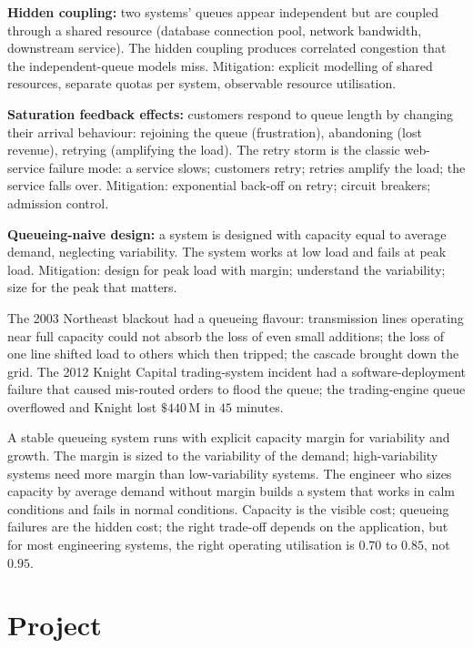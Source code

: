 \textbf{Hidden coupling:} two systems' queues appear independent but are coupled through a shared resource (database connection pool, network bandwidth, downstream service). The hidden coupling produces correlated congestion that the independent-queue models miss. Mitigation: explicit modelling of shared resources, separate quotas per system, observable resource utilisation.

\textbf{Saturation feedback effects:} customers respond to queue length by changing their arrival behaviour: rejoining the queue (frustration), abandoning (lost revenue), retrying (amplifying the load). The retry storm is the classic web-service failure mode: a service slows; customers retry; retries amplify the load; the service falls over. Mitigation: exponential back-off on retry; circuit breakers; admission control.

\textbf{Queueing-naive design:} a system is designed with capacity equal to average demand, neglecting variability. The system works at low load and fails at peak load. Mitigation: design for peak load with margin; understand the variability; size for the peak that matters.

The 2003 Northeast blackout had a queueing flavour: transmission lines operating near full capacity could not absorb the loss of even small additions; the loss of one line shifted load to others which then tripped; the cascade brought down the grid. The 2012 Knight Capital trading-system incident had a software-deployment failure that caused mis-routed orders to flood the queue; the trading-engine queue overflowed and Knight lost $\$440\,\text{M}$ in $45$ minutes.

\begin{principle}
A stable queueing system runs with explicit capacity margin for variability and growth. The margin is sized to the variability of the demand; high-variability systems need more margin than low-variability systems. The engineer who sizes capacity by average demand without margin builds a system that works in calm conditions and fails in normal conditions. Capacity is the visible cost; queueing failures are the hidden cost; the right trade-off depends on the application, but for most engineering systems, the right operating utilisation is $0.70$ to $0.85$, not $0.95$.
\end{principle}

\section{Project}

